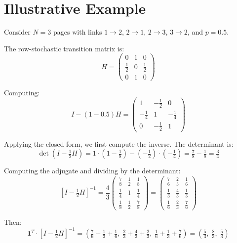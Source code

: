 \documentclass{article}
\begin{document}
\section{Illustrative Example}

Consider $N = 3$ pages with links $1 \to 2$, $2 \to 1$, $2 \to 3$, $3 \to 2$, and $p = 0.5$.

The row-stochastic transition matrix is:
\begin{equation}
    H = \begin{pmatrix} 0 & 1 & 0 \\ \frac{1}{2} & 0 & \frac{1}{2} \\ 0 & 1 & 0 \end{pmatrix}
\end{equation}

Computing:
\begin{equation}
    I - (1 - 0.5)H = \begin{pmatrix} 1 & -\frac{1}{2} & 0 \\ -\frac{1}{4} & 1 & -\frac{1}{4} \\ 0 & -\frac{1}{2} & 1 \end{pmatrix}
\end{equation}

Applying the closed form, we first compute the inverse. The determinant is:
\begin{equation}
    \det\left(I - \tfrac{1}{2}H\right) = 1\!\cdot\!\left(1 - \tfrac{1}{8}\right) - \left(-\tfrac{1}{2}\right)\!\cdot\!\left(-\tfrac{1}{4}\right) = \tfrac{7}{8} - \tfrac{1}{8} = \tfrac{3}{4}
\end{equation}

Computing the adjugate and dividing by the determinant:
\begin{equation}
    \left[I - \tfrac{1}{2}H\right]^{-1} = \frac{4}{3}\begin{pmatrix} \frac{7}{8} & \frac{1}{2} & \frac{1}{8} \\[4pt] \frac{1}{4} & 1 & \frac{1}{4} \\[4pt] \frac{1}{8} & \frac{1}{2} & \frac{7}{8} \end{pmatrix} = \begin{pmatrix} \frac{7}{6} & \frac{2}{3} & \frac{1}{6} \\[4pt] \frac{1}{3} & \frac{4}{3} & \frac{1}{3} \\[4pt] \frac{1}{6} & \frac{2}{3} & \frac{7}{6} \end{pmatrix}
\end{equation}

Then:
\begin{equation}
    \mathbf{1}^T \cdot \left[I - \tfrac{1}{2}H\right]^{-1} = \left(\tfrac{7}{6} + \tfrac{1}{3} + \tfrac{1}{6},\; \tfrac{2}{3} + \tfrac{4}{3} + \tfrac{2}{3},\; \tfrac{1}{6} + \tfrac{1}{3} + \tfrac{7}{6}\right) = \left(\tfrac{5}{3},\; \tfrac{8}{3},\; \tfrac{5}{3}\right)
\end{equation}
\end{document}
